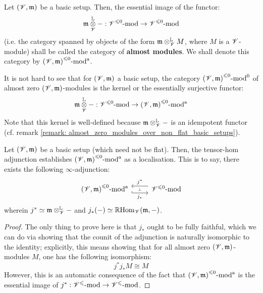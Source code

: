             \begin{definition} \label{def: almost_modules}
                Let $(\mathscr{V}, \mathfrak{m})$ be a basic setup. Then, the essential image of the functor:
                    $$\m \tensor_{\scrV}^{\L} -: {\scrV}^{\leq 0}\mod \to {\scrV}^{\leq 0}\mod$$
                (i.e. the category spanned by objects of the form $\m \tensor_{\scrV}^{\L} M$, where $M$ is a $\mathscr{V}$-module) shall be called the category of \textbf{almost modules}. We shall denote this category by ${(\mathscr{V}, \mathfrak{m})}^{\leqslant 0}\text{-}\mathrm{mod}^{\mathrm{a}}$.
            \end{definition}
            \begin{remark} \label{remark: categories_of_almost_zero_modules_are_kernels}
                It is not hard to see that for $(\mathscr{V}, \mathfrak{m})$ a basic setup, the category ${(\mathscr{V}, \mathfrak{m})}^{\leqslant 0}\text{-}\mathrm{mod}^0$ of almost zero $(\mathscr{V}, \mathfrak{m})$-modules is the kernel or the essentially surjective functor:
                    $$\m \tensor_{\scrV}^{\L} -: {\scrV}^{\leq 0}\mod \to {(\scrV, \m)}^{\leq 0}\mod^{\almost}$$
                Note that this kernel is well-defined because $\m \tensor_{\scrV}^{\L} -$ is an idempotent functor (cf. remark \ref{remark: almost_zero_modules_over_non_flat_basic_setups}).
            \end{remark}
            
            \begin{proposition} \label{prop: localising_at_almost_modules}
                Let $(\mathscr{V}, \mathfrak{m})$ be a basic setup (which need not be flat). Then, the tensor-hom adjunction establishes ${(\mathscr{V}, \mathfrak{m})}^{\leqslant 0}\text{-}\mathrm{mod}^{\mathrm{a}}$ as a localisation. This is to say, there exists the following $\infty$-adjunction:
                    $$
                        \begin{tikzcd}
                        	{{(\scrV, \m)}^{\leq 0}\mod^{\almost}} & {{\scrV}^{\leq 0}\mod}
                        	\arrow[""{name=0, anchor=center, inner sep=0}, "{j_*}"', shift right=2, hook, from=1-1, to=1-2]
                        	\arrow[""{name=1, anchor=center, inner sep=0}, "{j^*}"', shift right=2, from=1-2, to=1-1]
                        	\arrow["\dashv"{anchor=center, rotate=-90}, draw=none, from=1, to=0]
                        \end{tikzcd}
                    $$
                wherein $j^* \cong \m \tensor_{\scrV}^{\L} -$ and $j_*(-) \simeq \mathbb{R}\mathrm{Hom}_{\mathscr{V}}(\mathfrak{m}, -)$.
            \end{proposition}
                \begin{proof}
                    The only thing to prove here is that $j_*$ ought to be fully faithful, which we can do via showing that the counit of the adjunction is naturally isomorphic to the identity; explicitly, this means showing that for all almost zero $(\mathscr{V}, \mathfrak{m})$-modules $M$, one has the following isomorphism:
                        $$j^* j_* M \cong M$$
                    However, this is an automatic consequence of the fact that ${(\mathscr{V}, \mathfrak{m})}^{\leqslant 0}\text{-}\mathrm{mod}^{\mathrm{a}}$ is the essential image of $j^*: {\mathscr{V}}^{\leqslant}\text{-}\mathrm{mod} \to {\mathscr{V}}^{\leqslant}\text{-}\mathrm{mod}$.
                \end{proof}
            
